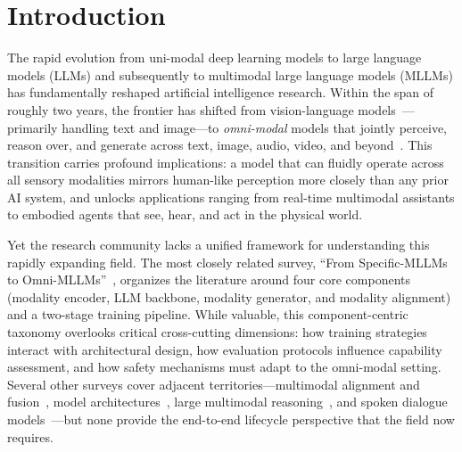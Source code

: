 \documentclass{article}
\begin{document}
\section{Introduction}
\label{sec:intro}

The rapid evolution from uni-modal deep learning models to large language models (LLMs) and subsequently to multimodal large language models (MLLMs) has fundamentally reshaped artificial intelligence research.
Within the span of roughly two years, the frontier has shifted from vision-language models~\cite{liu2024llava,li2023blip2}---primarily handling text and image---to \emph{omni-modal} models that jointly perceive, reason over, and generate across text, image, audio, video, and beyond~\cite{openai2024gpt4o,google2024gemini,qwen2026omni,seed2026omni}.
This transition carries profound implications: a model that can fluidly operate across all sensory modalities mirrors human-like perception more closely than any prior AI system, and unlocks applications ranging from real-time multimodal assistants to embodied agents that see, hear, and act in the physical world.

Yet the research community lacks a unified framework for understanding this rapidly expanding field.
The most closely related survey, ``From Specific-MLLMs to Omni-MLLMs''~\cite{song2024omnimllms}, organizes the literature around four core components (modality encoder, LLM backbone, modality generator, and modality alignment) and a two-stage training pipeline.
While valuable, this component-centric taxonomy overlooks critical cross-cutting dimensions: how training strategies interact with architectural design, how evaluation protocols influence capability assessment, and how safety mechanisms must adapt to the omni-modal setting.
Several other surveys cover adjacent territories---multimodal alignment and fusion~\cite{li2024multimodalalignment}, model architectures~\cite{wu2024evolution}, large multimodal reasoning~\cite{liu2025multimodalreasoning}, and spoken dialogue models~\cite{wang2024wavchat}---but none provide the end-to-end lifecycle perspective that the field now requires.
\end{document}

